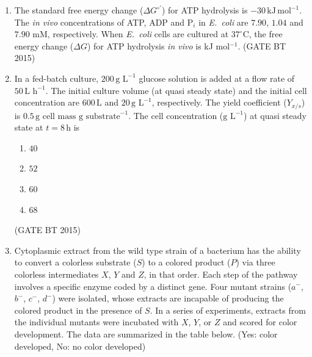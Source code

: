 \documentclass[journal,12pt,onecolumn]{IEEEtran}
\begin{document}
\begin{enumerate}[label=\textbf{Q.\arabic*}]
\item The standard free energy change ($\Delta G^{\circ\prime}$) for ATP hydrolysis is $-30 \, \text{kJ}\,\text{mol}^{-1}$. 
The \textit{in vivo} concentrations of ATP, ADP and P$_i$ in \textit{E.~coli} are $7.90$, $1.04$ and $7.90$ mM, respectively. 
When \textit{E.~coli} cells are cultured at $37^{\circ} \mathrm{C}$, the free energy change ($\Delta G$) for ATP hydrolysis \textit{in vivo} is \underline{\hspace{2cm}} kJ mol$^{-1}$. 
\hfill (GATE BT 2015)


\item In a fed-batch culture, $200 \, \text{g L}^{-1}$ glucose solution is added at a flow rate of $50 \, \text{L h}^{-1}$. 
The initial culture volume (at quasi steady state) and the initial cell concentration are $600 \, \text{L}$ and $20 \, \text{g L}^{-1}$, respectively. 
The yield coefficient ($Y_{x/s}$) is $0.5 \, \text{g cell mass g substrate}^{-1}$.  
The cell concentration ($\text{g L}^{-1}$) at quasi steady state at $t = 8 \, \text{h}$ is  

\begin{multicols}{4}
\begin{enumerate}
\item $40$  
\item $52$  
\item $60$  
\item $68$  
\end{enumerate}
\end{multicols}\hfill (GATE BT 2015)


\item Cytoplasmic extract from the wild type strain of a bacterium has the ability to convert a colorless substrate ($S$) to a colored product ($P$) via three colorless intermediates $X$, $Y$ and $Z$, in that order. Each step of the pathway involves a specific enzyme coded by a distinct gene. Four mutant strains ($a^-$, $b^-$, $c^-$, $d^-$) were isolated, whose extracts are incapable of producing the colored product in the presence of $S$. In a series of experiments, extracts from the individual mutants were incubated with $X$, $Y$, or $Z$ and scored for color development. The data are summarized in the table below. (Yes: color developed, No: no color developed)  


\end{enumerate}
\end{document}
